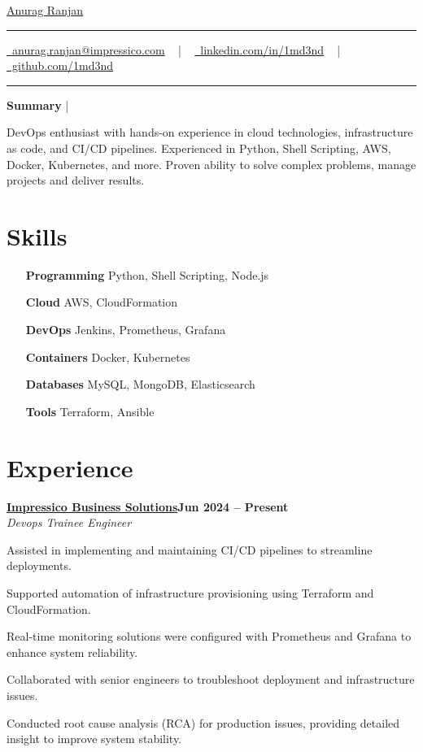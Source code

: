 \documentclass[letterpaper,10pt]{article}
\newcommand{\documentTitle}[2]{
  \begin{center}
    {\Huge\color{accentTitle} #1}
    \vspace{10pt}
    {\color{accentLine} \hrule}
    \vspace{2pt}
    \footnotesize{#2}
    \vspace{2pt}
    {\color{accentLine} \hrule}
  \end{center}
}
\newcommand{\tinysection}[1]{
  \phantomsection
  \addcontentsline{toc}{section}{#1}
  {\large{\bfseries\color{accentText}#1} {\color{accentLine} |}}
}
\newcommand{\heading}[2]{
  \hspace{10pt}#1\hfill#2\\
}
\newcommand{\headingBf}[2]{
  \heading{\textbf{#1}}{\textbf{#2}}
}
\newcommand{\headingIt}[2]{
  \heading{\textit{#1}}{\textit{#2}}
}
\newenvironment{resume_list}{
  \vspace{-7pt}
  \begin{itemize}[itemsep=-2px, parsep=1pt, leftmargin=30pt]
}{
  \end{itemize}
}
\begin{document}
\documentTitle{\href{https://1md3nd.com}{Anurag Ranjan}}{
  \href{mailto:anurag.ranjan@impressico.com}{\raisebox{-0.15\height} \faEnvelope\ anurag.ranjan@impressico.com} ~ | ~
  \href{https://linkedin.com/in/1md3nd}{\raisebox{-0.15\height} \faLinkedin\ linkedin.com/in/1md3nd} ~ | ~
  \href{https://github.com/1md3nd}{\raisebox{-0.15\height} \faGithub\ github.com/1md3nd}
}

\tinysection{Summary}
DevOps enthusiast with hands-on experience in cloud technologies, infrastructure as code, and CI/CD pipelines. Experienced in Python, Shell Scripting, AWS, Docker, Kubernetes, and more. Proven ability to solve complex problems, manage projects and deliver results.

\section{Skills}
\begin{multicols}{2}
  \begin{itemize}[itemsep=-2px, parsep=1pt, leftmargin=75pt]
    \item[\textbf{Programming}] Python, Shell Scripting, Node.js
    \item[\textbf{Cloud}] AWS, CloudFormation
    \item[\textbf{DevOps}] Jenkins, Prometheus, Grafana
    \item[\textbf{Containers}] Docker, Kubernetes
    \item[\textbf{Databases}] MySQL, MongoDB, Elasticsearch
    \item[\textbf{Tools}] Terraform, Ansible
  \end{itemize}
\end{multicols}

\section{Experience}

\headingBf{\href {https://www.impressico.com}{Impressico Business Solutions}}{Jun 2024 -- Present}  
\headingIt{Devops Trainee Engineer}{}  
\begin{resume_list}  
  \item Assisted in implementing and maintaining CI/CD pipelines to streamline deployments.  
  \item Supported automation of infrastructure provisioning using Terraform and CloudFormation.  
  \item Real-time monitoring solutions were configured with Prometheus and Grafana to enhance system reliability.  
  \item Collaborated with senior engineers to troubleshoot deployment and infrastructure issues.
  \item Conducted root cause analysis (RCA) for production issues, providing detailed insight to improve system stability.
\end{resume_list}
\end{document}
